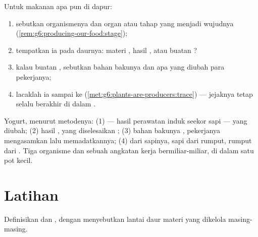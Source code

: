\begin{method}\label{met:g6:producing-our-food:read}
Untuk makanan apa pun di dapur:
\begin{enumerate}
  \item sebutkan organismenya dan organ atau tahap yang menjadi
        wujudnya (\cref{rem:g6:producing-our-food:stage});
  \item tempatkan ia pada daurnya: materi , hasil ,
        atau buatan ?
  \item kalau buatan , sebutkan bahan bakunya dan apa yang
        diubah para pekerjanya;
  \item lacaklah ia sampai ke 
        (\cref{met:g6:plants-are-producers:trace}) --- jejaknya tetap
        selalu berakhir di dalam .
\end{enumerate}
\end{method}

\begin{example}\label{ex:g6:producing-our-food:breakfast}
Yogurt, menurut metodenya: (1)  --- hasil perawatan induk seekor
sapi --- yang diubah; (2) hasil , yang diselesaikan ;
(3) bahan bakunya , pekerjanya mengasamkan lalu memadatkannya; (4)
 dari sapinya, sapi dari rumput, rumput dari . Tiga organisme
dan sebuah angkatan kerja bermiliar-miliar, di dalam satu pot kecil.
\end{example}

\section{Latihan}

\begin{exercise}[$\star$]\label{exo:g6:producing-our-food:1}
Definisikan  dan , dengan
menyebutkan lantai daur materi yang dikelola masing-masing.
\end{exercise}

